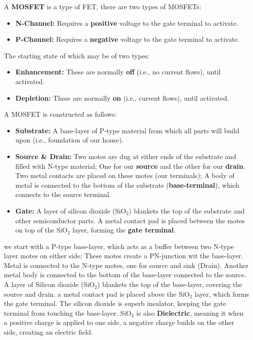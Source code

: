 \begin{Def}

    \label{def:mosfet_overview}

    A \textbf{MOSFET} is a type of FET, there are two types of MOSFETs:
    \begin{itemize}
      \item \textbf{N-Channel:} Requires a \textbf{positive} voltage to the gate terminal to activate.
      \item \textbf{P-Channel:} Requires a \textbf{negative} voltage to the gate terminal to activate.
    \end{itemize}
    \noindent
    The starting state of which may be of two types:
    \begin{itemize}
      \item \textbf{Enhancement:} These are normally \textbf{off} (i.e., no current flows), until activated.
      \item \textbf{Depletion:} These are normally \textbf{on} (i.e., current flows), until activated.
    \end{itemize}
  \end{Def}

\newpage 

\begin{Def}

    \label{def:mosfet}

    A MOSFET is constructed as follows:
    \begin{itemize}
      \item \textbf{Substrate:} A base-layer of P-type material from which all parts will build upon (i.e., foundation of our house).
      \item \textbf{Source \& Drain:} Two motes are dug at either ends of the substrate and filled with N-type material;
      One for our \textbf{source} and the other for our \textbf{drain}. Two metal contacts are placed on these motes (our terminals);
      A body of metal is connected to the bottom of the substrate (\textbf{base-terminal}), which connects to the source terminal.
      \item \textbf{Gate:} A layer of silicon dioxide (SiO$_2$) blankets the top of the substrate and other semiconductor parts.
      A metal contact pad is placed between the motes on top of the SiO$_2$ layer, forming the \textbf{gate terminal}.
    \end{itemize}
    we start with a P-type base-layer, which acts as a buffer between two 
    N-type layer motes on either side; These motes create a PN-junction wit the base-layer. Metal is connected 
    to the N-type motes, one for source and sink (Drain). Another metal body is connected to the bottom of the base-layer
    connected to the source. A layer of Silicon dioxide (SiO$_2$) blankets the top of the base-layer, covering the source and drain.
    a metal contact pad is placed above the SiO$_2$ layer, which forms the gate terminal.
    The silicon dioxide is superb insulator, keeping the gate terminal from touching the base-layer. SiO$_2$ 
    is also \textbf{Dielectric}, meaning it when a positive charge is applied to one side, a negative charge builds on the other side, creating an electric field. 
\end{Def}